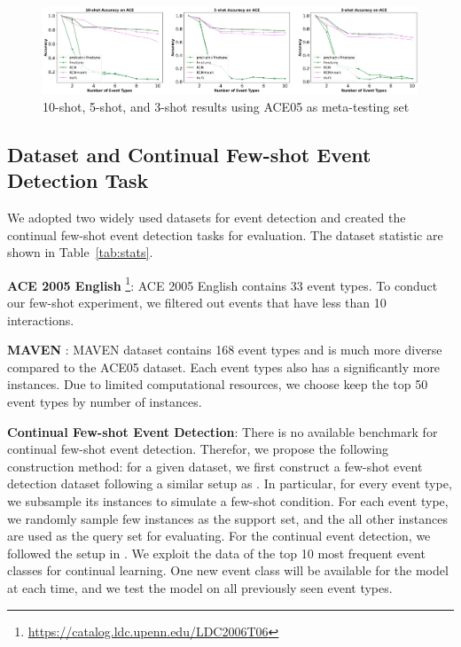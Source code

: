 


\begin{figure}[ht]
\centering
    \includegraphics[scale=0.28]{imgs/MAVEN_ACE.jpg}
    \caption{10-shot, 5-shot, and 3-shot results using ACE05 as meta-testing set}
    \label{img:result_ACE}
\end{figure}
  
\subsection{Dataset and Continual Few-shot Event Detection Task}
We adopted two widely used datasets for event detection and created the continual few-shot event detection tasks for evaluation. The dataset statistic are shown in Table~\ref{tab:stats}.

\noindent
\textbf{ACE 2005 English} \footnote{\url{https://catalog.ldc.upenn.edu/LDC2006T06}}: ACE 2005 English contains 33 event types.  To conduct our few-shot experiment, we filtered out events that have less than 10 interactions.

\noindent
\textbf{MAVEN} \citep{wang2020MAVEN}: MAVEN dataset contains 168 event types and is much more diverse compared to the ACE05 dataset. Each event types also has a significantly more instances.  Due to limited computational resources,  we choose keep the top 50 event types by number of instances.  

\noindent
\textbf{Continual Few-shot Event Detection}: There is no available benchmark for continual few-shot event detection. Therefor, we propose the following construction method: for a given dataset,  we first construct a few-shot event detection dataset following a similar setup as \citep{chen2021honey}.  In particular,  for every event type,  we subsample its instances to simulate a few-shot condition.  For each event type, we randomly sample few instances as the support set, and the all other instances are used as the query set for evaluating.  For the continual event detection,  we followed the setup in \citep{cao2020incremental}.  We exploit the data of the top 10 most frequent event classes for continual learning. One new event class will be available for the model at each time, and we test the model on all previously seen event types. 


